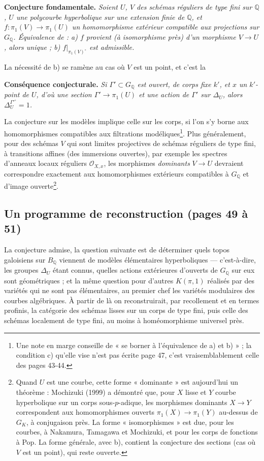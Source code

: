 \documentclass[11pt,a4paper]{article}
\begin{document}
\textbf{Conjecture fondamentale.} \emph{Soient $U$, $V$ des schémas
réguliers de type fini sur $\mathbb{Q}$, $U$ une polycourbe hyperbolique sur
une extension finie de $\mathbb{Q}$, et $f : \pi_1(V) \to \pi_1(U)$ un
homomorphisme extérieur compatible aux projections sur $G_{\mathbb{Q}}$.
Équivalence de : a) $f$ provient (à isomorphisme près) d'un morphisme $V \to
U$, alors unique ; b) $f|_{\pi_1(V)^{\circ}}$ est admissible.}

La nécessité de b) se ramène au cas où $V$ est un point, et c'est la

\textbf{Conséquence conjecturale.} \emph{Si $\Gamma' \subset G_{\mathbb{Q}}$
est ouvert, de corps fixe $k'$, et $x$ un $k'$-point de $U$, d'où une
section $\Gamma' \to \pi_1(U)$ et une action de $\Gamma'$ sur $\Delta_U$,
alors $\Delta_U^{\Gamma'^{\circ}} = 1$.}

La conjecture sur les modèles implique celle sur les corps, si l'on s'y borne
aux homomorphismes compatibles aux filtrations modéliques\footnote{Une note
en marge conseille de « se borner à l'équivalence de a) et b) » ; la condition
c) qu'elle vise n'est pas écrite page 47, c'est vraisemblablement celle des
pages 43-44.}. Plus généralement, pour des schémas $V$ qui sont limites projectives de
schémas réguliers de type fini, à transitions affines (des immersions
ouvertes), par exemple les spectres d'anneaux locaux réguliers
$\mathcal{O}_{X,x}$, les morphismes \emph{dominants} $V \to U$ devraient
correspondre exactement aux homomorphismes extérieurs compatibles à
$G_{\mathbb{Q}}$ et d'image ouverte\footnote{Quand $U$ est une courbe, cette
forme « dominante » est aujourd'hui un théorème : Mochizuki (1999) a démontré
que, pour $X$ lisse et $Y$ courbe hyperbolique sur un corps sous-$p$-adique,
les morphismes dominants $X \to Y$ correspondent aux homomorphismes ouverts
$\pi_1(X) \to \pi_1(Y)$ au-dessus de $G_K$, à conjugaison près. La forme
« isomorphismes » est due, pour les courbes, à Nakamura, Tamagawa et
Mochizuki, et pour les corps de fonctions à Pop.
La forme générale, avec b), contient la conjecture des sections (cas où $V$ est
un point), qui reste ouverte.}.

\subsection*{Un programme de reconstruction (pages 49 à 51)}

La conjecture admise, la question suivante est de déterminer quels topos
galoisiens sur $B_{\mathbb{Q}}$ viennent de modèles élémentaires
hyperboliques — c'est-à-dire, les groupes $\Delta_U$ étant connus, quelles
actions extérieures d'ouverts de $G_{\mathbb{Q}}$ sur eux sont
géométriques ; et la même question pour d'autres $K(\pi, 1)$ réalisés par des
variétés qui ne sont pas élémentaires, au premier chef les variétés
modulaires des courbes algébriques. À partir de là on reconstruirait, par
recollement et en termes profinis, la catégorie des schémas lisses sur un corps
de type fini, puis celle des schémas localement de type fini, au moins à
homéomorphisme universel près.
\end{document}
